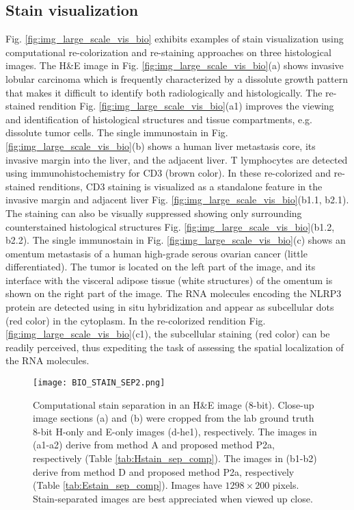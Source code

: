 \documentclass[superscriptaddress,longbibliography,aps,prl,twocolumn,10pt]{revtex4-2}
\begin{document}
\subsection*{\normalsize{Stain visualization}}
Fig. \ref{fig:img_large_scale_vis_bio} exhibits examples of stain visualization using computational re-colorization and re-staining approaches on three histological images. The H\&E image in Fig. \ref{fig:img_large_scale_vis_bio}(a) shows invasive lobular carcinoma which is frequently characterized by a dissolute growth pattern that makes it difficult to identify both radiologically and histologically. The re-stained rendition Fig. \ref{fig:img_large_scale_vis_bio}(a1) improves the viewing and identification of histological structures and tissue compartments, e.g. dissolute tumor cells. The single immunostain in Fig. \ref{fig:img_large_scale_vis_bio}(b) shows a human liver metastasis core, its invasive margin into the liver, and the adjacent liver. T lymphocytes are detected using immunohistochemistry for CD3 (brown color). In these re-colorized and re-stained renditions, CD3 staining is visualized as a standalone feature in the invasive margin and adjacent liver Fig. \ref{fig:img_large_scale_vis_bio}(b1.1, b2.1). The staining can also be visually suppressed showing only surrounding counterstained histological structures Fig. \ref{fig:img_large_scale_vis_bio}(b1.2, b2.2). The single immunostain in Fig. \ref{fig:img_large_scale_vis_bio}(c) shows an omentum metastasis of a human high-grade serous ovarian cancer (little differentiated). The tumor is located on the left part of the image, and its interface with the visceral adipose tissue (white structures) of the omentum is shown on the right part of the image. The RNA molecules encoding the NLRP3 protein are detected using in situ hybridization and appear as subcellular dots (red color) in the cytoplasm. In the re-colorized rendition Fig. \ref{fig:img_large_scale_vis_bio}(c1), the subcellular staining (red color) can be readily perceived, thus expediting the task of assessing the spatial localization of the RNA molecules.

\begin{figure}[t]
\centering
\texttt{[image: BIO\_STAIN\_SEP2.png]}
\vspace{-12pt}
\caption{\footnotesize{Computational stain separation in an H\&E image (8-bit). Close-up image sections (a) and (b) were cropped from the lab ground truth 8-bit H-only and E-only images (d-he1), respectively. The images in (a1-a2) derive from method A \cite{Ruifrok2001} and proposed method P2a, respectively (Table \ref{tab:Hstain_sep_comp}). The images in (b1-b2) derive from method D \cite{Khan2014, stain_normalisation_toolbox_v2_2, Macenko2009} and proposed method P2a, respectively (Table \ref{tab:Estain_sep_comp}). Images have $1298 \times 200$ pixels. Stain-separated images are best appreciated when viewed up close.}}
\label{fig:img_stainsep_bio}
\end{figure}
\end{document}
